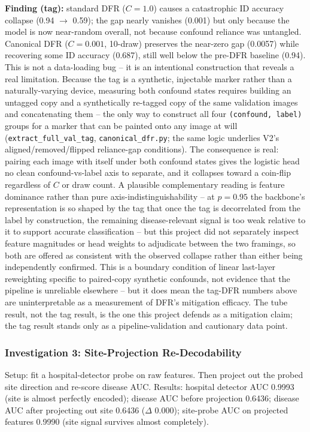 \documentclass{ieeeaccess}
\begin{document}
\textbf{Finding (tag):} standard DFR ($C=1.0$) causes a catastrophic ID
accuracy collapse (0.94 $\to$ 0.59); the gap nearly vanishes (0.001) but only
because the model is now near-random overall, not because confound reliance
was untangled. Canonical DFR ($C=0.001$, 10-draw) preserves the near-zero
gap (0.0057) while recovering some ID accuracy (0.687), still well below the
pre-DFR baseline (0.94). This is not a data-loading bug -- it is an
intentional construction that reveals a real limitation. Because the tag is
a synthetic, injectable marker rather than a naturally-varying device,
measuring both confound states requires building an untagged copy and a
synthetically re-tagged copy of the same validation images and concatenating
them -- the only way to construct all four \texttt{(confound, label)} groups
for a marker that can be painted onto any image at will
(\texttt{extract\_full\_val\_tag}, \texttt{canonical\_dfr.py}; the same logic
underlies V2's aligned/removed/flipped reliance-gap conditions). The
consequence is real: pairing each image with itself under both confound
states gives the logistic head no clean confound-vs-label axis to separate,
and it collapses toward a coin-flip regardless of $C$ or draw count. A
plausible complementary reading is feature dominance rather than pure
axis-indistinguishability -- at $p=0.95$ the backbone's representation is so
shaped by the tag that once the tag is decorrelated from the label by
construction, the remaining disease-relevant signal is too weak relative to
it to support accurate classification -- but this project did not separately
inspect feature magnitudes or head weights to adjudicate between the two
framings, so both are offered as consistent with the observed collapse
rather than either being independently confirmed. This is a boundary
condition of linear last-layer reweighting specific to paired-copy synthetic
confounds, not evidence that the pipeline is unreliable elsewhere -- but it
does mean the tag-DFR numbers above are uninterpretable as a measurement of
DFR's mitigation efficacy. The tube result, not the tag result, is the one
this project defends as a mitigation claim; the tag result stands only as a
pipeline-validation and cautionary data point.

\subsubsection{Investigation 3: Site-Projection Re-Decodability}
Setup: fit a hospital-detector probe on raw features. Then project out the
probed site direction and re-score disease AUC. Results: hospital detector
AUC 0.9993 (site is almost perfectly encoded); disease AUC before projection
0.6436; disease AUC after projecting out site 0.6436 ($\Delta$ 0.000);
site-probe AUC on projected features 0.9990 (site signal survives almost
completely).
\end{document}
